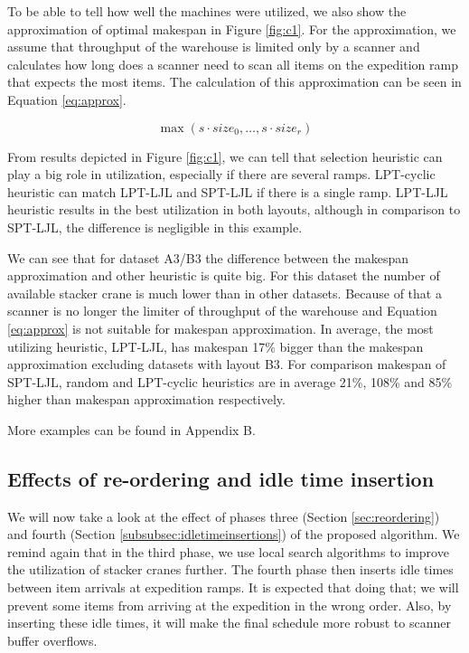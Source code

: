 \documentclass{ctuthesis}
\begin{document}
To be able to tell how well the machines were utilized, we also show the approximation of optimal makespan in Figure \ref{fig:c1}. For the approximation, we assume that throughput of the warehouse is limited only by a scanner and calculates how long does a scanner need to scan all items on the expedition ramp that expects the most items. The calculation of this approximation can be seen in Equation \ref{eq:approx}.

\begin{equation}
\label{eq:approx}
    \max(s \cdot size_0, \ldots, s \cdot size_r)
\end{equation}


From results depicted in Figure \ref{fig:c1}, we can tell that selection heuristic can play a big role in utilization, especially if there are several ramps. LPT-cyclic heuristic can match LPT-LJL and SPT-LJL if there is a single ramp. LPT-LJL heuristic results in the best utilization in both layouts, although in comparison to SPT-LJL, the difference is negligible in this example.

We can see that for dataset A3/B3 the difference between the makespan approximation and other heuristic is quite big. For this dataset the number of available stacker crane is much lower than in other datasets. Because of that a scanner is no longer the limiter of throughput of the warehouse and Equation \ref{eq:approx} is not suitable for makespan approximation. In average,  the most utilizing heuristic, LPT-LJL, has makespan 17\% bigger than the makespan approximation excluding datasets with layout B3. For comparison makespan of SPT-LJL, random and LPT-cyclic heuristics are in average 21\%, 108\% and 85\% higher than makespan approximation respectively.

More examples can be found in Appendix B.

\subsection{Effects of re-ordering and idle time insertion}

We will now take a look at the effect of phases three (Section \ref{sec:reordering}) and fourth (Section \ref{subsubsec:idletimeinsertions}) of the proposed algorithm. We remind again that in the third phase, we use local search algorithms to improve the utilization of stacker cranes further. The fourth phase then inserts idle times between item arrivals at expedition ramps. It is expected that doing that; we will prevent some items from arriving at the expedition in the wrong order. Also, by inserting these idle times, it will make the final schedule more robust to scanner buffer overflows.
\end{document}
